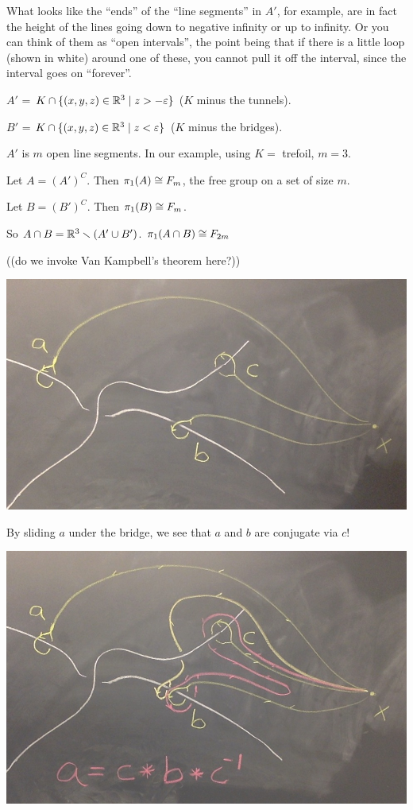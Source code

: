 \documentclass[11pt,leqno,oneside]{amsart}
\numberwithin{thm}{section}
\newcommand{\minus}{\smallsetminus}
\renewcommand{\epsilon}{\varepsilon}
\newcommand{\fund}{\pi_1}
\begin{document}
\begin{example}
  What looks like the ``ends'' of the ``line segments'' in $A'$, for example, are in fact the height of the lines going down to negative infinity or up to infinity.  Or you can think of them as ``open intervals'', the point being that if there is a little loop (shown in white) around one of these, you cannot pull it off the interval, since the interval goes on ``forever''.

  $A'$ = $K \cap \{(x,y,z) \in \R^3 \mid z > -\epsilon\}$ ($K$ minus the tunnels).

  $B'$ = $K \cap \{(x,y,z) \in \R^3 \mid z < \epsilon\}$ ($K$ minus the bridges).

  $A'$ is $m$ open line segments.  In our example, using $K =$ trefoil, $m = 3$.

  Let $A = (A')^C$.  Then $\fund(A) \isom F_m$, the free group on a set of size $m$.

  Let $B = (B')^C$.  Then $\fund(B) \isom F_m$.

  So $A \cap B = \R^3 \minus (A' \union B')$.  $\fund(A \cap B) \isom F_{2m}$

  ((do we invoke Van Kampbell's theorem here?))

  \includegraphics[scale=0.2]{images/mountains.jpg}

  By sliding $a$ under the bridge, we see that $a$ and $b$ are conjugate via $c$!

  \includegraphics[scale=0.2]{images/mountains-with-explanation.jpg}


\end{example}
\end{document}

